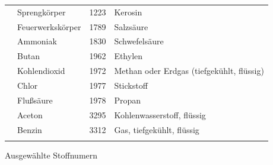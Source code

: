 \documentclass[
ngerman,
paper=a4,
asymmetric,
fontsize=8pt,
draft=false,
numbers=noenddot,
bibtotocnumbered,
footnotes=multiple,
toc=flat,
]{scrbook}
\begin{document}
{}
{}
{
\begin{tabulary}{\linewidth}{cLcL}
\toprule{} & Sprengkörper & 1223 & Kerosin
\\ & Feuerwerkskörper & 1789 & Salzsäure
\\ & Ammoniak & 1830 & Schwefelsäure
\\ & Butan & 1962 & Ethylen
\\ & Kohlendioxid & 1972 & Methan oder Erdgas (tiefgekühlt, flüssig)
\\ & Chlor & 1977 & Stickstoff
\\ & Flußsäure & 1978 & Propan
\\ & Aceton & 3295 & Kohlenwasserstoff, flüssig
\\ & Benzin & 3312 & Gas, tiefgekühlt, flüssig
\\\addlinespace\bottomrule
\end{tabulary}
}
{Ausgewählte Stoffnumern}
{}
\end{document}
